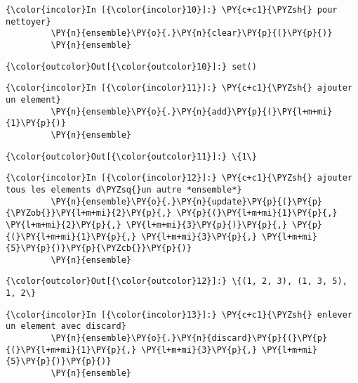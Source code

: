     \begin{Verbatim}[commandchars=\\\{\}]
{\color{incolor}In [{\color{incolor}10}]:} \PY{c+c1}{\PYZsh{} pour nettoyer}
         \PY{n}{ensemble}\PY{o}{.}\PY{n}{clear}\PY{p}{(}\PY{p}{)}
         \PY{n}{ensemble}
\end{Verbatim}


\begin{Verbatim}[commandchars=\\\{\}]
{\color{outcolor}Out[{\color{outcolor}10}]:} set()
\end{Verbatim}
            
    \begin{Verbatim}[commandchars=\\\{\}]
{\color{incolor}In [{\color{incolor}11}]:} \PY{c+c1}{\PYZsh{} ajouter un element}
         \PY{n}{ensemble}\PY{o}{.}\PY{n}{add}\PY{p}{(}\PY{l+m+mi}{1}\PY{p}{)}
         \PY{n}{ensemble}
\end{Verbatim}


\begin{Verbatim}[commandchars=\\\{\}]
{\color{outcolor}Out[{\color{outcolor}11}]:} \{1\}
\end{Verbatim}
            
    \begin{Verbatim}[commandchars=\\\{\}]
{\color{incolor}In [{\color{incolor}12}]:} \PY{c+c1}{\PYZsh{} ajouter tous les elements d\PYZsq{}un autre *ensemble*}
         \PY{n}{ensemble}\PY{o}{.}\PY{n}{update}\PY{p}{(}\PY{p}{\PYZob{}}\PY{l+m+mi}{2}\PY{p}{,} \PY{p}{(}\PY{l+m+mi}{1}\PY{p}{,} \PY{l+m+mi}{2}\PY{p}{,} \PY{l+m+mi}{3}\PY{p}{)}\PY{p}{,} \PY{p}{(}\PY{l+m+mi}{1}\PY{p}{,} \PY{l+m+mi}{3}\PY{p}{,} \PY{l+m+mi}{5}\PY{p}{)}\PY{p}{\PYZcb{}}\PY{p}{)}
         \PY{n}{ensemble}
\end{Verbatim}


\begin{Verbatim}[commandchars=\\\{\}]
{\color{outcolor}Out[{\color{outcolor}12}]:} \{(1, 2, 3), (1, 3, 5), 1, 2\}
\end{Verbatim}
            
    \begin{Verbatim}[commandchars=\\\{\}]
{\color{incolor}In [{\color{incolor}13}]:} \PY{c+c1}{\PYZsh{} enlever un element avec discard}
         \PY{n}{ensemble}\PY{o}{.}\PY{n}{discard}\PY{p}{(}\PY{p}{(}\PY{l+m+mi}{1}\PY{p}{,} \PY{l+m+mi}{3}\PY{p}{,} \PY{l+m+mi}{5}\PY{p}{)}\PY{p}{)}
         \PY{n}{ensemble}
\end{Verbatim}



